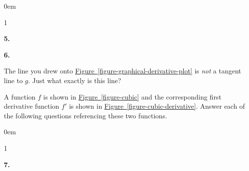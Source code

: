 \documentclass[12pt,]{book}
\theoremstyle{plain}
\theoremstyle{definition}
\numberwithin{equation}{section}
\newcounter{figstack}
\newcounter{figindex}
\newlength\fight
\newcommand\pushValignCaptionBottom[5][b]{%
\stepcounter{figstack}%
\expandafter\def\csname %
figalign\romannumeral\value{figstack}\endcsname{#1}%
\expandafter\def\csname %
figtype\romannumeral\value{figstack}\endcsname{#2}%
\expandafter\def\csname %
figwd\romannumeral\value{figstack}\endcsname{#3}%
\expandafter\def\csname %
figcontent\romannumeral\value{figstack}\endcsname{#4}%
\expandafter\def\csname %
figcap\romannumeral\value{figstack}\endcsname{#5}%
\setbox0=\hbox{%
\begin{#2}{#3}#4\end{#2}}%
\ifdim\dimexpr\ht0+\dp0\relax>\fight\global\setlength{\fight}{%
\dimexpr\ht0+\dp0\relax}\fi%
}
\newcommand\popValignCaptionBottom{%
\setcounter{figindex}{0}%
\hfill%
\whiledo{\value{figindex}<\value{figstack}}{%
\stepcounter{figindex}%
\def\tmp{\csname figwd\romannumeral\value{figindex}\endcsname}%
\begin{\csname figtype\romannumeral\value{figindex}\endcsname}[t]{\tmp}%
\centering%
\stackinset{c}{}%
{\csname figalign\romannumeral\value{figindex}\endcsname}{}%
{\csname figcontent\romannumeral\value{figindex}\endcsname}%
{\rule{0pt}{\fight}}\par%
\csname figcap\romannumeral\value{figindex}\endcsname%
\end{\csname figtype\romannumeral\value{figindex}\endcsname}%
\hfill%
}%
\setcounter{figstack}{0}%
\setlength{\fight}{0pt}%
\hfill%
}
\newenvironment{exercisegroup}%
{\medskip\noindent}%
{\par\bigskip}%
\newlength{\exercisegroupindent}%
\newlength{\exercisegroupitemwidth}%
\newenvironment{exercisegrouplist}%
{\vspace{-\partopsep}%
\begin{adjustwidth}{\exercisegroupindent}{0em}}%
{\end{adjustwidth}%
\vspace{-\partopsep}%
\vspace{\baselineskip}}%
\newenvironment{exercisegroupbycol}[1]%
{\begin{exercisegrouplist}%
\vspace{-\multicolsep}%
\begin{multicols}{#1}%
\setlength{\parindent}{0em}%
\setlength{\exercisegroupitemwidth}{\linewidth}}%
{\end{multicols}%
\vspace{-\multicolsep}%
\end{exercisegrouplist}}%
\newenvironment{exercisegroupitem}[1]%
{\begin{minipage}[t]{\exercisegroupitemwidth}
\vspace{0pt}%
{\bfseries#1}%
\rule{0pt}{\baselineskip}}{\strut%
\end{minipage}%
\hspace{\columnsep}}%
\providecommand\phantomsection{}
\newcommand{\fe}[2]{\mathop{{#1}{\left(#2\right)}}}
\newcommand{\fd}[1]{#1'}
\begin{document}
\begin{exercisegroup}
\begin{exercisegroupbycol}{1}
\begin{exercisegroupitem}{5. }
\end{exercisegroupitem}%
\par%
\begin{exercisegroupitem}{6. }\phantomsection\hypertarget{exercise-158}{\null}
The line you drew onto \hyperref[figure-graphical-derivative-plot]{Figure~\ref*{figure-graphical-derivative-plot}} is \emph{not} a tangent line to \(g\). Just what exactly is this line?%
\end{exercisegroupitem}%
\par%
\end{exercisegroupbycol}%
\end{exercisegroup}%
\begin{exercisegroup}%
A function \(f\) is shown in \hyperref[figure-cubic]{Figure~\ref*{figure-cubic}} and the corresponding first derivative function \(\fd{f}\) is shown in \hyperref[figure-cubic-derivative]{Figure~\ref*{figure-cubic-derivative}}. Answer each of the following questions referencing these two functions.%
\begin{exercisegroupbycol}{1}%
\begin{exercisegroupitem}{7. }\phantomsection\hypertarget{exercise-159}{\null}

\end{exercisegroupitem}
\end{exercisegroupbycol}
\end{exercisegroup}
\end{document}
